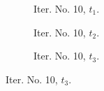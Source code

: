 \documentclass[a4paper,12pt]{amsart}
\numberwithin{equation}{section}
\begin{document}
\begin{figure}[h!]
\begin{subfigure}[t]{0.23\textwidth}
    \caption{Iter. No. 10, $t_1$.}
\end{subfigure}
	\hfill
\begin{subfigure}[t]{0.23\textwidth}
    \caption{Iter. No. 10, $t_2$.}
\end{subfigure}
	\hfill
\begin{subfigure}[t]{0.23\textwidth}
    \caption{Iter. No. 10, $t_3$.}
\end{subfigure}


\end{figure}
\end{document}
